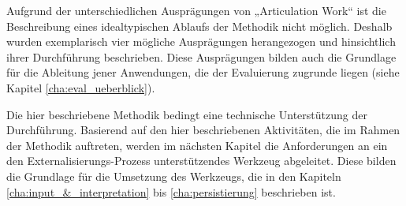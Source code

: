 Aufgrund der unterschiedlichen Ausprägungen von „Articulation Work“ ist die Beschreibung eines idealtypischen Ablaufs der Methodik nicht möglich. Deshalb wurden exemplarisch vier mögliche Ausprägungen herangezogen und hinsichtlich ihrer Durchführung beschrieben. Diese Ausprägungen bilden auch die Grundlage für die Ableitung jener Anwendungen, die der Evaluierung zugrunde liegen (siehe Kapitel \ref{cha:eval_ueberblick}).

Die hier beschriebene Methodik bedingt eine technische Unterstützung der Durchführung. Basierend auf den hier beschriebenen Aktivitäten, die im Rahmen der Methodik auftreten, werden im nächsten Kapitel die Anforderungen an ein den Externalisierungs-Prozess unterstützendes Werkzeug abgeleitet. Diese bilden die Grundlage für die Umsetzung des Werkzeugs, die in den Kapiteln \ref{cha:input_&_interpretation} bis \ref{cha:persistierung} beschrieben ist.

